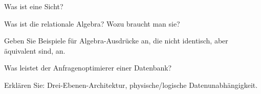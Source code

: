 \begin{fragen}
  \item Was ist eine Sicht?
  \item Was ist die relationale Algebra? Wozu braucht man sie?
  \item Geben Sie Beispiele für Algebra-Ausdrücke an, die nicht identisch, aber äquivalent sind, an.
  \item Was leistet der Anfragenoptimierer einer Datenbank?
  \item Erklären Sie: Drei-Ebenen-Architektur, physische/logische Datenunabhängigkeit.
\end{fragen}